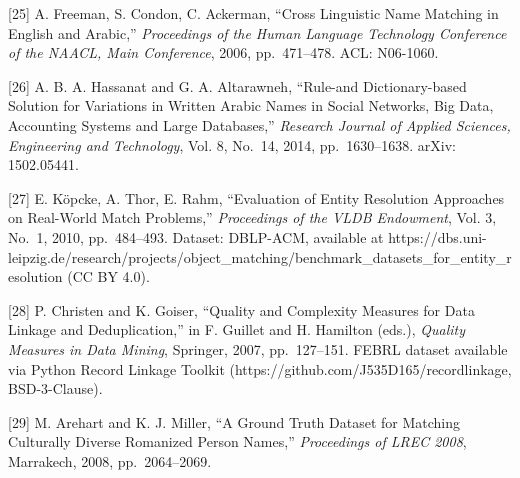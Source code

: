 \documentclass[
  11pt,
]{article}
\begin{document}
{[}25{]} A. Freeman, S. Condon, C. Ackerman, ``Cross Linguistic Name
Matching in English and Arabic,'' \emph{Proceedings of the Human
Language Technology Conference of the NAACL, Main Conference}, 2006,
pp.~471--478. ACL: N06-1060.

{[}26{]} A. B. A. Hassanat and G. A. Altarawneh, ``Rule-and
Dictionary-based Solution for Variations in Written Arabic Names in
Social Networks, Big Data, Accounting Systems and Large Databases,''
\emph{Research Journal of Applied Sciences, Engineering and Technology},
Vol. 8, No.~14, 2014, pp.~1630--1638. arXiv: 1502.05441.

{[}27{]} E. K\"opcke, A. Thor, E. Rahm, ``Evaluation of Entity Resolution
Approaches on Real-World Match Problems,'' \emph{Proceedings of the VLDB
Endowment}, Vol. 3, No.~1, 2010, pp.~484--493. Dataset: DBLP-ACM,
available at
https://dbs.uni-leipzig.de/research/projects/object\_matching/benchmark\_datasets\_for\_entity\_resolution
(CC BY 4.0).

{[}28{]} P. Christen and K. Goiser, ``Quality and Complexity Measures
for Data Linkage and Deduplication,'' in F. Guillet and H. Hamilton
(eds.), \emph{Quality Measures in Data Mining}, Springer, 2007,
pp.~127--151. FEBRL dataset available via Python Record Linkage Toolkit
(https://github.com/J535D165/recordlinkage, BSD-3-Clause).

{[}29{]} M. Arehart and K. J. Miller, ``A Ground Truth Dataset for
Matching Culturally Diverse Romanized Person Names,'' \emph{Proceedings
of LREC 2008}, Marrakech, 2008, pp.~2064--2069.
\end{document}
